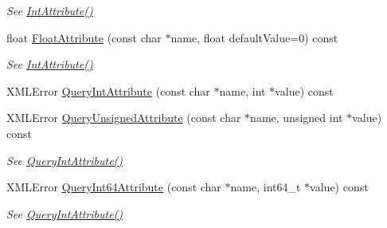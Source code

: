 \begin{DoxyCompactItemize}
\begin{DoxyCompactList}\small\item\em See \mbox{\hyperlink{classtinyxml2_1_1XMLElement_a95a89b13bb14a2d4655e2b5b406c00d4}{Int\+Attribute()}} \end{DoxyCompactList}\item 
\mbox{\label{classtinyxml2_1_1XMLElement_ab1f4be2332e27dc640e9b6abd01d64dd}} 
float \mbox{\hyperlink{classtinyxml2_1_1XMLElement_ab1f4be2332e27dc640e9b6abd01d64dd}{Float\+Attribute}} (const char $\ast$name, float default\+Value=0) const
\begin{DoxyCompactList}\small\item\em See \mbox{\hyperlink{classtinyxml2_1_1XMLElement_a95a89b13bb14a2d4655e2b5b406c00d4}{Int\+Attribute()}} \end{DoxyCompactList}\item 
X\+M\+L\+Error \mbox{\hyperlink{classtinyxml2_1_1XMLElement_a8a78bc1187c1c45ad89f2690eab567b1}{Query\+Int\+Attribute}} (const char $\ast$name, int $\ast$value) const
\item 
\mbox{\label{classtinyxml2_1_1XMLElement_a26fc84cbfba6769dafcfbf256c05e22f}} 
X\+M\+L\+Error \mbox{\hyperlink{classtinyxml2_1_1XMLElement_a26fc84cbfba6769dafcfbf256c05e22f}{Query\+Unsigned\+Attribute}} (const char $\ast$name, unsigned int $\ast$value) const
\begin{DoxyCompactList}\small\item\em See \mbox{\hyperlink{classtinyxml2_1_1XMLElement_a8a78bc1187c1c45ad89f2690eab567b1}{Query\+Int\+Attribute()}} \end{DoxyCompactList}\item 
\mbox{\label{classtinyxml2_1_1XMLElement_a7c0955d80b6f8d196744eacb0f6e90a8}} 
X\+M\+L\+Error \mbox{\hyperlink{classtinyxml2_1_1XMLElement_a7c0955d80b6f8d196744eacb0f6e90a8}{Query\+Int64\+Attribute}} (const char $\ast$name, int64\+\_\+t $\ast$value) const
\begin{DoxyCompactList}\small\item\em See \mbox{\hyperlink{classtinyxml2_1_1XMLElement_a8a78bc1187c1c45ad89f2690eab567b1}{Query\+Int\+Attribute()}} \end{DoxyCompactList}\item 
\mbox{\label{classtinyxml2_1_1XMLElement_a14c1bb77c39689838be01838d86ca872}} 

\end{DoxyCompactItemize}
